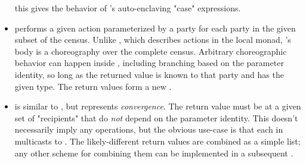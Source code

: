 \begin{itemize}
          this gives the behavior of \HLSCentral's auto-enclaving "case" expressions.
    \item {} performs a given action parameterized by a party
          for each party in the given subset of the census.
          Unlike , which describes actions in the local monad,
          's body is a choreography over the complete census.
          Arbitrary choreographic behavior can happen inside ,
          including branching based on the parameter identity,
          so long as the returned value is known to that party and has the given type.
          The return values form a new .
    \item {} is similar to , but represents \emph{convergence}.
          The return value must be  at a given set of "recipients"
          that do \emph{not} depend on the parameter identity.
          This doesn't necessarily imply any \inlinecode{~>} operations,
          but the obvious use-case is that each  in 
          multicasts to .
          The likely-different return values are combined as a simple  list;
          any other scheme for combining them can be implemented
          in a subsequent .
\end{itemize}


